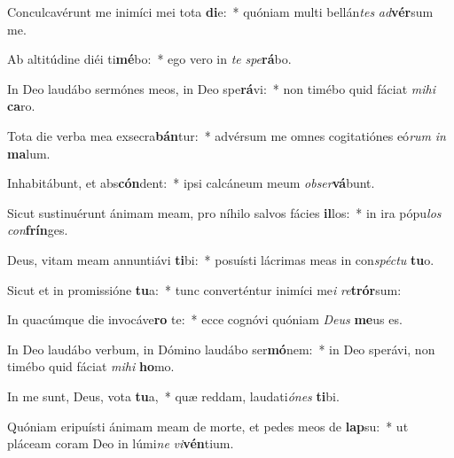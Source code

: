 \item Conculcavérunt me inimíci mei tota \textbf{di}e:~* quóniam multi bellán\textit{tes} \textit{ad}\textbf{vér}sum me.
\item Ab altitúdine diéi ti\textbf{mé}bo:~* ego vero in \textit{te} \textit{spe}\textbf{rá}bo.
\item In Deo laudábo sermónes meos, in Deo spe\textbf{rá}vi:~* non timébo quid fáciat \textit{mi}\textit{hi} \textbf{ca}ro.
\item Tota die verba mea exsecra\textbf{bán}tur:~* advérsum me omnes cogitatiónes eó\textit{rum} \textit{in} \textbf{ma}lum.
\item Inhabitábunt, et abs\textbf{cón}dent:~* ipsi calcáneum meum \textit{ob}\textit{ser}\textbf{vá}bunt.
\item Sicut sustinuérunt ánimam meam, pro níhilo salvos fácies \textbf{il}los:~* in ira pópu\textit{los} \textit{con}\textbf{frín}ges.
\item Deus, vitam meam annuntiávi \textbf{ti}bi:~* posuísti lácrimas meas in con\textit{spéc}\textit{tu} \textbf{tu}o.
\item Sicut et in promissióne \textbf{tu}a:~* tunc converténtur inimíci me\textit{i} \textit{re}\textbf{trór}sum:
\item In quacúmque die invocáve\textbf{ro} te:~* ecce cognóvi quóniam \textit{De}\textit{us} \textbf{me}us es.
\item In Deo laudábo verbum, in Dómino laudábo ser\textbf{mó}nem:~* in Deo sperávi, non timébo quid fáciat \textit{mi}\textit{hi} \textbf{ho}mo.
\item In me sunt, Deus, vota \textbf{tu}a,~* quæ reddam, laudati\textit{ó}\textit{nes} \textbf{ti}bi.
\item Quóniam eripuísti ánimam meam de morte, et pedes meos de \textbf{lap}su:~* ut pláceam coram Deo in lúmi\textit{ne} \textit{vi}\textbf{vén}tium.
